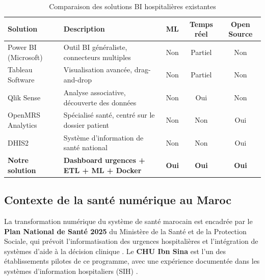 \documentclass[12pt,a4paper]{report}
\begin{document}
	\begin{table}[H]
		\centering
		\caption{Comparaison des solutions BI hospitalières existantes}
		\renewcommand{\arraystretch}{1.3}
		\begin{tabularx}{\textwidth}{lXccc}
			\toprule
			\textbf{Solution} & \textbf{Description} & \textbf{ML} & \textbf{Temps réel} & \textbf{Open Source} \\
			\midrule
			Power BI (Microsoft) & Outil BI généraliste, connecteurs multiples & Non & Partiel & Non \\
			Tableau Software     & Visualisation avancée, drag-and-drop         & Non & Partiel & Non \\
			Qlik Sense           & Analyse associative, découverte des données  & Non & Oui     & Non \\
			OpenMRS Analytics    & Spécialisé santé, centré sur le dossier patient & Non & Non & Oui \\
			DHIS2                & Système d'information de santé national      & Non & Non     & Oui \\
			\textbf{Notre solution} & \textbf{Dashboard urgences + ETL + ML + Docker} & \textbf{Oui} & \textbf{Oui} & \textbf{Oui} \\
			\bottomrule
		\end{tabularx}
	\end{table}
	\newpage
	\subsection{Contexte de la santé numérique au Maroc}
	
	La transformation numérique du système de santé marocain est encadrée par le
	\textbf{Plan National de Santé 2025} du Ministère de la Santé et de la Protection
	Sociale, qui prévoit l'informatisation des urgences hospitalières et l'intégration
	de systèmes d'aide à la décision clinique \cite{msps2021}. Le \textbf{CHU Ibn Sina}
	est l'un des établissements pilotes de ce programme, avec une expérience documentée
	dans les systèmes d'information hospitaliers (SIH) \cite{chuis2022}.
	
\end{document}
